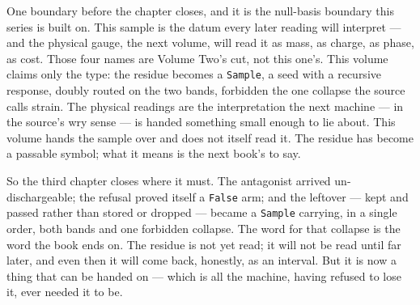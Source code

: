 One boundary before the chapter closes, and it is the null-basis boundary this series is built on. This sample is the
datum every later reading will interpret --- and the physical gauge, the next volume, will read it as mass, as charge,
as phase, as cost. Those four names are Volume Two's cut, not this one's. This volume claims only the type: the residue
becomes a \verb|Sample|, a seed with a recursive response, doubly routed on the two bands, forbidden the one collapse
the source calls strain. The physical readings are the interpretation the next machine --- in the source's wry sense ---
is handed something small enough to lie about. This volume hands the sample over and does not itself read it. The
residue has become a passable symbol; what it means is the next book's to say.

So the third chapter closes where it must. The antagonist arrived un-dischargeable; the refusal proved itself a
\verb|False| arm; and the leftover --- kept and passed rather than stored or dropped --- became a \verb|Sample|
carrying, in a single order, both bands and one forbidden collapse. The word for that collapse is the word the book
ends on. The residue is not yet read; it will not be read until far later, and even then it will come back, honestly, as
an interval. But it is now a thing that can be handed on --- which is all the machine, having refused to lose it, ever
needed it to be.
